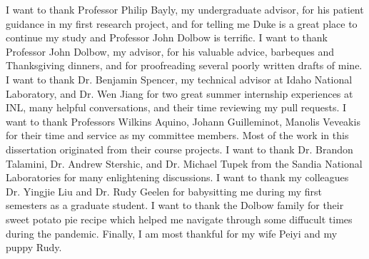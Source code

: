 \acknowledgements

I want to thank Professor Philip Bayly, my undergraduate advisor, for his patient guidance in my first research project, and for telling me Duke is a great place to continue my study and Professor John Dolbow is terrific. I want to thank Professor John Dolbow, my advisor, for his valuable advice, barbeques and Thanksgiving dinners, and for proofreading several poorly written drafts of mine. I want to thank Dr. Benjamin Spencer, my technical advisor at Idaho National Laboratory, and Dr. Wen Jiang for two great summer internship experiences at INL, many helpful conversations, and their time reviewing my pull requests. I want to thank Professors Wilkins Aquino, Johann Guilleminot, Manolis Veveakis for their time and service as my committee members. Most of the work in this dissertation originated from their course projects. I want to thank Dr. Brandon Talamini, Dr. Andrew Stershic, and Dr. Michael Tupek from the Sandia National Laboratories for many enlightening discussions. I want to thank my colleagues Dr. Yingjie Liu and Dr. Rudy Geelen for babysitting me during my first semesters as a graduate student. I want to thank the Dolbow family for their sweet potato pie recipe which helped me navigate through some diffucult times during the pandemic. Finally, I am most thankful for my wife Peiyi and my puppy Rudy.
